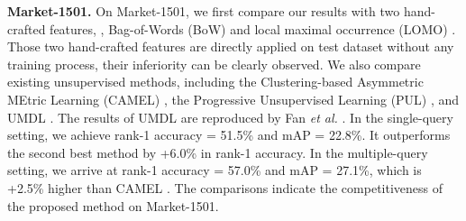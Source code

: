 \documentclass[10pt,twocolumn,letterpaper]{article}
\begin{document}
\textbf{Market-1501.} On Market-1501, we first compare our results with two hand-crafted features, \ie, Bag-of-Words (BoW) \cite{DBLP:conf/iccv/ZhengSTWWT15} and local maximal occurrence (LOMO) \cite{DBLP:conf/cvpr/LiaoHZL15}. Those two hand-crafted features are directly applied on test dataset without any training process, their inferiority can be clearly observed.
We also compare existing unsupervised methods, including the Clustering-based Asymmetric MEtric Learning (CAMEL) \cite{CAMEL}, the Progressive Unsupervised Learning (PUL) \cite{fan17unsupervised}, and UMDL \cite{DBLP:conf/cvpr/PengXWPGHT16}. The results of UMDL are reproduced by Fan \emph{et al.} \cite{fan17unsupervised}. In the single-query setting, we achieve rank-1 accuracy = 51.5\% and mAP = 22.8\%. It outperforms the second best method \cite{fan17unsupervised} by +6.0\% in rank-1 accuracy. In the multiple-query setting, we arrive at rank-1 accuracy = 57.0\% and mAP = 27.1\%, which is +2.5\% higher than CAMEL \cite{CAMEL}. The comparisons indicate the competitiveness of the proposed method on Market-1501.
\end{document}

